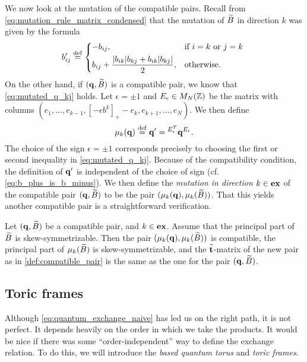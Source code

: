 We now look at the mutation of the compatible pairs. Recall from
\cref{eq:mutation_rule_matrix_condensed} that the mutation of $\widetilde{B}$ in direction $k$
was given by the formula
\begin{equation*}
	b'_{ij} \defeq \begin{dcases*}
		-b_{ij},                                            & if $i = k$ or $j = k$ \\
		b_{ij} + \frac{|b_{ik}|b_{kj} + b_{ik}|b_{kj}|}{2}, & otherwise.
	\end{dcases*}
\end{equation*}
%
On the other hand, if $(\mathbf{q}, \widetilde{B})$ is a compatible pair, we know that
\cref{eq:mutated_q_kj} holds. Let $\epsilon = \pm 1$ and $E_{\epsilon} \in M_N(\mathbb{Z})$
be the matrix with columns $(e_1, \dots, e_{k-1}, [-\epsilon b^k]_{+} - e_k, e_{k+1},
	\dots, e_N)$. We then define
\begin{equation}\label{eq:def_mutation_q}
	\mu_k(\mathbf{q}) \overset{\mathrm{def}}{=} \mathbf{q}' = \prescript{E_{\epsilon}^T}{}{}\mathbf{q}^{E_\epsilon}.
\end{equation}
%
The choice of the sign $\epsilon = \pm 1$ corresponds precisely to choosing the first
or second inequality in \cref{eq:mutated_q_kj}. Because of the compatibility condition,
the definition of $\mathbf{q}'$ is independent of the choice of sign (cf.
\cref{eq:b_plus_is_b_minus}). We then define the \emph{mutation in direction $k \in
		\mathbf{ex}$} of the compatible pair $(\mathbf{q}, \widetilde{B})$ to be
the pair $(\mu_k (\mathbf{q}),\mu_k (\widetilde{B}) )$. That this yields another compatible pair is a
straightforward verification.
\begin{proposition}\label{prop:mutation_preserves_good_things}

	Let $(\mathbf{q}, \widetilde{B})$ be a compatible pair, and $k \in \mathbf{ex}$. Assume that the principal part
	of $\widetilde{B}$ is skew-symmetrizable. Then the pair $(\mu_k (\mathbf{q}), \mu_k(\widetilde{B}))$ is
	compatible, the principal part of $\mu_k(\widetilde{B})$ is skew-symmetrizable, and the
	$\widetilde{\mathbf{t}}$-matrix of the new pair as in \cref{def:compatible_pair} is the same as the
	one for the pair $(\mathbf{q}, \widetilde{B})$.
\end{proposition}

\subsection{Toric frames}

Although \cref{eq:quantum_exchange_naive} has led us on the right path, it is not
perfect. It depends heavily on the order in which we take the products. It would be
nice if there was some ``order-independent'' way to define the exchange relation. To do
this, we will introduce the \emph{based quantum torus} and
\emph{toric frames}.

